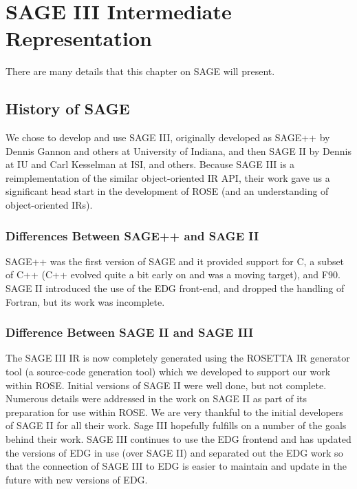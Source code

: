 \chapter{SAGE III Intermediate Representation}
\label{SageIII}

There are many details that this chapter on SAGE will present.



\section{History of SAGE}
    We chose to develop and use SAGE III, originally 
developed as SAGE++ by Dennis Gannon and others at University 
of Indiana, and then SAGE II by Dennis at IU and Carl Kesselman at ISI,
and others.  Because SAGE III is a reimplementation of the similar
object-oriented IR API, their work gave us a significant head 
start in the development of ROSE (and an understanding of 
object-oriented IRs).

\subsection{Differences Between SAGE++ and SAGE II}
     SAGE++ was the first version of SAGE and it provided
support for C, a subset of C++ (C++ evolved quite a bit early on
and was a moving target), and F90. SAGE II introduced the use
of the EDG front-end, and dropped the handling of Fortran, 
but its work was incomplete.

\subsection{Difference Between SAGE II and SAGE III}
   The SAGE III IR is now completely generated using the ROSETTA
IR generator tool (a source-code generation tool) which we
developed to support our work within ROSE.  Initial versions 
of SAGE II were well done, but not complete.  Numerous 
details were addressed in the work on SAGE II as part of its 
preparation for use within ROSE.  We are very thankful to the 
initial developers of SAGE II for all their work.  Sage III
hopefully fulfills on a number of the goals behind their work.
SAGE III continues to use the EDG frontend and has updated
the versions of EDG in use (over SAGE II) and separated
out the EDG work so that the connection of SAGE III to EDG
is easier to maintain and update in the future with new versions 
of EDG.

